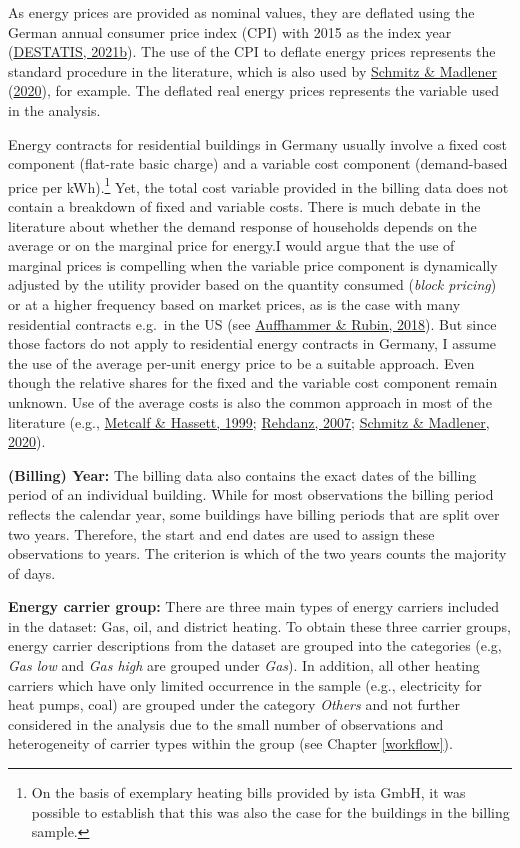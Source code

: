 \documentclass[12pt,twoside]{reedthesis}
\begin{document}
As energy prices are provided as nominal values, they are deflated using the German annual consumer price index (CPI) with 2015 as the index year (\protect\hyperlink{ref-destatis21}{DESTATIS, 2021b}). The use of the CPI to deflate energy prices represents the standard procedure in the literature, which is also used by \protect\hyperlink{ref-schmitz_madlener20}{Schmitz \& Madlener} (\protect\hyperlink{ref-schmitz_madlener20}{2020}), for example. The deflated real energy prices represents the variable used in the analysis.

Energy contracts for residential buildings in Germany usually involve a fixed cost component (flat-rate basic charge) and a variable cost component (demand-based price per kWh).\footnote{On the basis of exemplary heating bills provided by ista GmbH, it was possible to establish that this was also the case for the buildings in the billing sample.} Yet, the total cost variable provided in the billing data does not contain a breakdown of fixed and variable costs. There is much debate in the literature about whether the demand response of households depends on the average or on the marginal price for energy.I would argue that the use of marginal prices is compelling when the variable price component is dynamically adjusted by the utility provider based on the quantity consumed (\emph{block pricing}) or at a higher frequency based on market prices, as is the case with many residential contracts e.g.~in the US (see \protect\hyperlink{ref-auffhammer_rubin18}{Auffhammer \& Rubin, 2018}). But since those factors do not apply to residential energy contracts in Germany, I assume the use of the average per-unit energy price to be a suitable approach. Even though the relative shares for the fixed and the variable cost component remain unknown. Use of the average costs is also the common approach in most of the literature (e.g., \protect\hyperlink{ref-metcalf_hassett99}{Metcalf \& Hassett, 1999}; \protect\hyperlink{ref-rehdanz07}{Rehdanz, 2007}; \protect\hyperlink{ref-schmitz_madlener20}{Schmitz \& Madlener, 2020}).

\textbf{(Billing) Year:} The billing data also contains the exact dates of the billing period of an individual building. While for most observations the billing period reflects the calendar year, some buildings have billing periods that are split over two years. Therefore, the start and end dates are used to assign these observations to years. The criterion is which of the two years counts the majority of days.

\textbf{Energy carrier group:} There are three main types of energy carriers included in the dataset: Gas, oil, and district heating. To obtain these three carrier groups, energy carrier descriptions from the dataset are grouped into the categories (e.g, \emph{Gas low} and \emph{Gas high} are grouped under \emph{Gas}). In addition, all other heating carriers which have only limited occurrence in the sample (e.g., electricity for heat pumps, coal) are grouped under the category \emph{Others} and not further considered in the analysis due to the small number of observations and heterogeneity of carrier types within the group (see Chapter \ref{workflow}).
\end{document}
